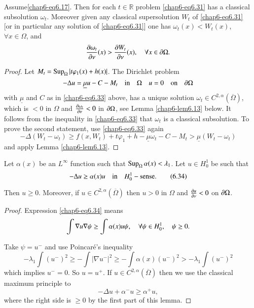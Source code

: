 \begin{lemma}\label{chap6-lem6.12}
Assume\pageoriginale \eqref{chap6-eq6.17}. Then for each
$t\in\mathbb{R}$ problem \eqref{chap6-eq6.31} has a classical
subsolution $\omega_{t}$. Moreover given any classical supersolution
$W_{t}$ of \eqref{chap6-eq6.31} [or in particular any solution of
  \eqref{chap6-eq6.31}] one has $\omega_{t}(x)<W_{t}(x)$, $\forall
x\in \Omega$, and
$$
\frac{\partial \omega_{t}}{\partial \nu}(x)>\frac{\partial W_{t}}{\partial \nu}(x),\quad \forall
x\in \partial \Omega.
$$
\end{lemma}

\begin{proof}
Let $M_{t}=\operatorname{Sup}_{\Omega}|t\varphi_{1}(x)+h(x)|$. The Dirichlet problem
$$
-\Delta u=\underline{\mu}u-C-M_{t}\quad\text{in}\quad \Omega\quad
u=0\quad\text{on}\quad \partial\Omega
$$
with $\underline{\mu}$ and $C$ as in \eqref{chap6-eq6.33} above, has a
unique solution $\omega_{t}\in C^{2,\alpha}(\overline{\Omega})$, which
is $<0$ in $\Omega$ and $\frac{\partial \omega_{t}}{\partial \nu}<0$ in
$\partial\Omega$, see Lemma \ref{chap6-lem6.13} below. It follows from the
inequality in \eqref{chap6-eq6.33} that $\omega_{t}$ is a classical
subsolution. To prove the second statement, use \eqref{chap6-eq6.33}
again
$$
-\Delta (W_{t}-\omega_{t})\geq
f(x,W_{t})+t\varphi_{1}+h-\underline{\mu}\omega_{t}-C-M_{t}>\underline{\mu}(W_{t}-\omega_{t}) 
$$
and apply Lemma \ref{chap6-lem6.13}.
\end{proof}

\begin{lemma}\label{chap6-lem6.13}
Let $\alpha(x)$ be an $L^{\infty}$ function such that
$\operatorname{Sup}_{\Omega}\alpha(x)<\lambda_{1}$. Let $u\in H^{1}_{0}$ be such
that
\begin{equation*}
-\Delta u\geq \alpha(x)u\quad \text{in}\quad
H^{1}_{0}-\text{sense}.\tag{6.34}\label{chap6-eq6.34} 
\end{equation*}

Then $u\geq 0$. Moreover, if $u\in C^{2,\alpha}(\overline{\Omega})$
then $u>0$ in $\Omega$ and $\frac{\partial u}{\partial \nu}<0$ on $\partial \Omega$. 
\end{lemma}

\begin{proof}
Expression \eqref{chap6-eq6.34} means
$$
\int \nabla u\nabla \psi\geq \int \alpha(x)u\psi,\quad \forall \psi \in
H^{1}_{0},\quad \psi\geq 0.
$$

Take $\psi=u^{-}$ and use Poincar\'e's inequality
$$
-\lambda_{1}\int (u^{-})^{2}\geq -\int |\nabla u^{-}|^{2}\geq -\int
\alpha(x)(u^{-})^{2}>-\lambda_{1}\int (u^{-})^{2}
$$
which implies $u^{-}=0$. So $u=u^{+}$. If $u\in
C^{2,\alpha}(\overline{\Omega})$ then we use the classical maximum
principle to
$$
-\Delta u+\alpha^{-}u\geq \alpha^{+}u,
$$
where the right side is $\geq 0$ by the first part of this lemma.
\end{proof}

